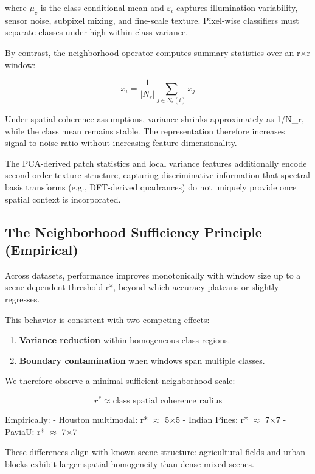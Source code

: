 \documentclass[
  journal]{IEEEtran}
\providecommand{\tightlist}{%
  \setlength{\itemsep}{0pt}\setlength{\parskip}{0pt}}
\begin{document}
where \(\mu_c\) is the class-conditional mean and \(\varepsilon_i\) captures illumination
variability, sensor noise, subpixel mixing, and fine-scale texture.
Pixel-wise classifiers must separate classes under high within-class
variance.

By contrast, the neighborhood operator computes summary statistics over
an r\(\times\)r window:

\[\bar{x}_i = \frac{1}{|N_r|} \sum_{j \in N_r(i)} x_j\]

Under spatial coherence assumptions, variance shrinks approximately as
1/\textbar N\_r\textbar, while the class mean remains stable. The
representation therefore increases signal-to-noise ratio without
increasing feature dimensionality.

The PCA-derived patch statistics and local variance features
additionally encode second-order texture structure, capturing
discriminative information that spectral basis transforms (e.g.,
DFT-derived quadrances) do not uniquely provide once spatial context is
incorporated.

\subsection{The Neighborhood Sufficiency Principle
(Empirical)}\label{the-neighborhood-sufficiency-principle-empirical}

Across datasets, performance improves monotonically with window size up
to a scene-dependent threshold r*, beyond which accuracy plateaus or
slightly regresses.

This behavior is consistent with two competing effects:

\begin{enumerate}
\def\labelenumi{\arabic{enumi}.}
\tightlist
\item
  \textbf{Variance reduction} within homogeneous class regions.
\item
  \textbf{Boundary contamination} when windows span multiple classes.
\end{enumerate}

We therefore observe a minimal sufficient neighborhood scale:

\[r^* \approx \text{class spatial coherence radius}\]

Empirically: - Houston multimodal: r* \(\approx\) 5\(\times\)5 - Indian Pines: r* \(\approx\) 7\(\times\)7 -
PaviaU: r* \(\approx\) 7\(\times\)7

These differences align with known scene structure: agricultural fields
and urban blocks exhibit larger spatial homogeneity than dense mixed
scenes.
\end{document}
